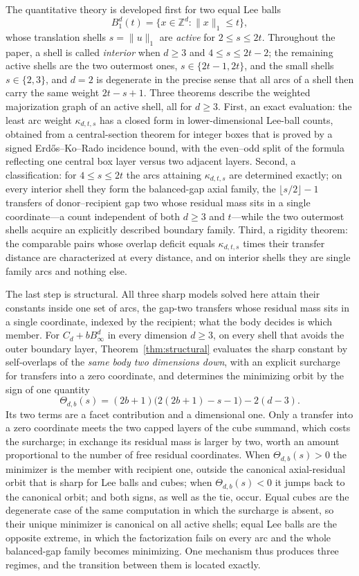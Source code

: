 \documentclass[pdflatex,sn-mathphys-num]{sn-jnl}
\theoremstyle{thmstyleone}
\theoremstyle{thmstylethree}
\theoremstyle{thmstyletwo}
\newcommand{\Z}{\mathbb Z}
\begin{document}
The quantitative theory is developed first for two equal Lee balls
\[
 B_1^d(t)=\{x\in\Z^d:\|x\|_1\le t\},
\]
whose translation shells $s=\|u\|_1$ are \emph{active} for $2\le s\le2t$.
Throughout the paper, a shell is called \emph{interior} when $d\ge3$ and
$4\le s\le2t-2$; the remaining active shells are the two outermost ones,
$s\in\{2t-1,2t\}$, and the small shells $s\in\{2,3\}$, and $d=2$ is
degenerate in the precise sense that all arcs of a shell then carry the same
weight $2t-s+1$.  Three theorems describe the weighted majorization graph of
an active shell, all for $d\ge3$.  First, an exact evaluation: the least arc
weight $\kappa_{d,t,s}$ has a closed form in lower-dimensional Lee-ball
counts, obtained from a central-section theorem for integer boxes that is
proved by a signed Erd\H{o}s--Ko--Rado incidence bound, with the even--odd
split of the formula reflecting one central box layer versus two adjacent
layers.  Second, a classification: for $4\le s\le2t$ the arcs attaining
$\kappa_{d,t,s}$ are determined exactly; on every interior shell they form
the balanced-gap axial family, the $\lfloor s/2\rfloor-1$ transfers of
donor--recipient gap two whose residual mass sits in a single
coordinate---a count independent of both $d\ge3$ and $t$---while the two
outermost shells acquire an explicitly described boundary family.  Third, a
rigidity theorem: the comparable pairs whose overlap deficit equals
$\kappa_{d,t,s}$ times their transfer distance are characterized at every
distance, and on interior shells they are single family arcs and nothing
else.

The last step is structural.  All three sharp models solved here attain their
constants inside one set of arcs, the gap-two transfers whose residual mass
sits in a single coordinate, indexed by the recipient; what the body decides is
which member.  For $C_d+bB_\infty^d$ in every dimension
$d\ge3$, on every shell that avoids the outer boundary layer,
Theorem~\ref{thm:structural} evaluates the sharp constant by self-overlaps of
the \emph{same body two dimensions down}, with an explicit surcharge for
transfers into a zero coordinate, and determines the minimizing orbit by the
sign of one quantity
\[
 \Theta_{d,b}(s)=(2b+1)\bigl(2(2b+1)-s-1\bigr)-2(d-3).
\]
Its two terms are a facet contribution and a dimensional one.  Only a
transfer into a zero coordinate meets the two capped layers of the cube
summand, which costs the surcharge; in exchange its residual mass is larger
by two, worth an amount proportional to the number of free residual
coordinates.  When $\Theta_{d,b}(s)>0$ the
minimizer is the member with recipient one, outside the canonical
axial-residual orbit that is sharp for Lee balls and cubes; when
$\Theta_{d,b}(s)<0$ it jumps back to the canonical orbit; and both signs, as
well as the tie, occur.  Equal cubes are the degenerate case of the same
computation in which the surcharge is absent, so their unique minimizer is
canonical on all active shells; equal Lee balls are the opposite extreme, in
which the factorization fails on every arc and the whole balanced-gap family
becomes minimizing.  One mechanism thus produces three regimes, and the
transition between them is located exactly.
\end{document}
